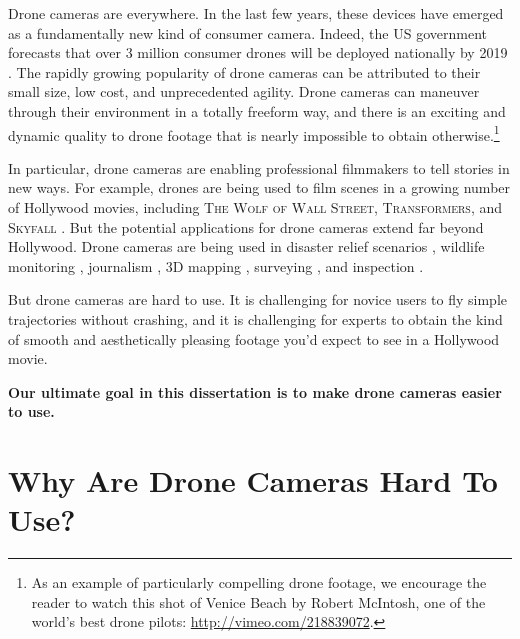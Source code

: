 Drone cameras are everywhere.
In the last few years, these devices have emerged as a fundamentally new kind of consumer camera.
Indeed, the US government forecasts that over 3 million consumer drones will be deployed nationally by 2019 \cite{faa:2017}.
The rapidly growing popularity of drone cameras can be attributed to their small size, low cost, and unprecedented agility.
Drone cameras can maneuver through their environment in a totally freeform way, and there is an exciting and dynamic quality to drone footage that is nearly impossible to obtain otherwise.\footnote{As an example of particularly compelling drone footage, we encourage the reader to watch this shot of Venice Beach by Robert McIntosh, one of the world's best drone pilots: \url{http://vimeo.com/218839072}.}

In particular, drone cameras are enabling professional filmmakers to tell stories in new ways. 
For example, drones are being used to film scenes in a growing number of Hollywood movies, including \textsc{The Wolf of Wall Street}, \textsc{Transformers}, and \textsc{Skyfall} \cite{nyt:2014,wsj:2015}.
But the potential applications for drone cameras extend far beyond Hollywood.
Drone cameras are being used in disaster relief scenarios \cite{michael:2012}, wildlife monitoring \cite{duke:2017}, journalism \cite{indivisible:2017}, 3D mapping \cite{pix4d:2015}, surveying \cite{3dr:2017a}, and inspection \cite{alexis:2015}.

But drone cameras are hard to use.
It is challenging for novice users to fly simple trajectories without crashing, and it is challenging for experts to obtain the kind of smooth and aesthetically pleasing footage you'd expect to see in a Hollywood movie.

\begin{tcolorbox}[before skip=20pt, after skip=20pt, sharp corners]
\begin{center}
\textbf{Our ultimate goal in this dissertation is to make drone cameras easier to use.}
\end{center}
\end{tcolorbox}

\section{Why Are Drone Cameras Hard To Use?}



